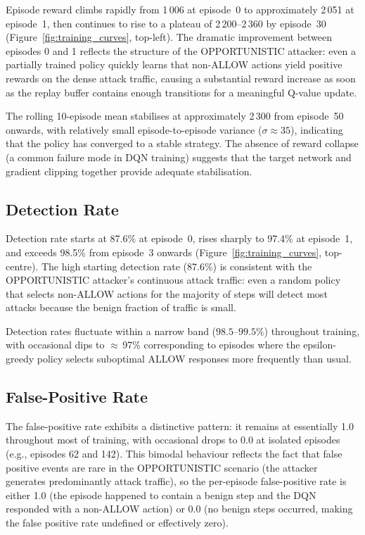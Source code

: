 Episode reward climbs rapidly from 1\,006 at episode~0 to approximately
2\,051 at episode~1, then continues to rise to a plateau of 2\,200--2\,360
by episode~30 (Figure~\ref{fig:training_curves}, top-left).
The dramatic improvement between episodes 0 and 1 reflects the structure of
the OPPORTUNISTIC attacker: even a partially trained policy quickly learns
that non-ALLOW actions yield positive rewards on the dense attack traffic,
causing a substantial reward increase as soon as the replay buffer contains
enough transitions for a meaningful Q-value update.

The rolling 10-episode mean stabilises at approximately 2\,300 from
episode~50 onwards, with relatively small episode-to-episode variance
($\sigma \approx 35$), indicating that the policy has converged to a
stable strategy.
The absence of reward collapse (a common failure mode in DQN training)
suggests that the target network and gradient clipping together provide
adequate stabilisation.

\subsection{Detection Rate}

Detection rate starts at 87.6\% at episode~0, rises sharply to 97.4\% at
episode~1, and exceeds 98.5\% from episode~3 onwards
(Figure~\ref{fig:training_curves}, top-centre).
The high starting detection rate (87.6\%) is consistent with the
OPPORTUNISTIC attacker's continuous attack traffic: even a random policy
that selects non-ALLOW actions for the majority of steps will detect most
attacks because the benign fraction of traffic is small.

Detection rates fluctuate within a narrow band ($98.5$--$99.5\%$) throughout
training, with occasional dips to $\approx$\,97\% corresponding to episodes
where the epsilon-greedy policy selects suboptimal ALLOW responses more
frequently than usual.

\subsection{False-Positive Rate}

The false-positive rate exhibits a distinctive pattern: it remains at
essentially 1.0 throughout most of training, with occasional drops to 0.0
at isolated episodes (e.g., episodes 62 and 142).
This bimodal behaviour reflects the fact that false positive events are
rare in the OPPORTUNISTIC scenario (the attacker generates predominantly
attack traffic), so the per-episode false-positive rate is either 1.0
(the episode happened to contain a benign step and the DQN responded
with a non-ALLOW action) or 0.0 (no benign steps occurred, making the
false positive rate undefined or effectively zero).

